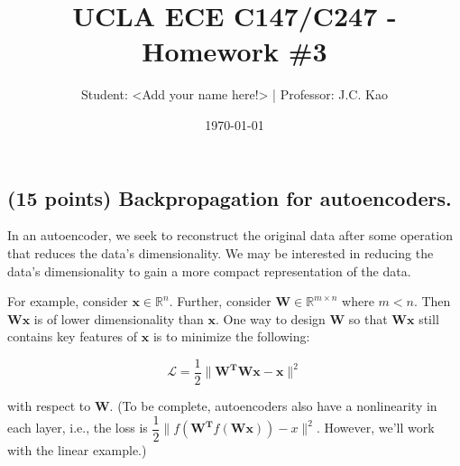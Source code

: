 \documentclass{article}
\title{UCLA ECE C147/C247 - Homework \#3}
\author{Student: <Add your name here!> | Professor: J.C. Kao} %
\date{\today}
\begin{document}
\maketitle

\subsection*{(15 points) Backpropagation for autoencoders. \newline}

In an autoencoder, we seek to reconstruct the original data after some operation that reduces the data’s dimensionality. We may be interested in reducing the data’s dimensionality to gain a more compact representation of the data.

For example, consider $\mathbf{x} \in \mathbb{R}^n$. Further, consider $\mathbf{W} \in \mathbb{R}^{m \times n}$ where $m < n$. Then $\mathbf{Wx}$ is of lower dimensionality than $\mathbf{x}$. One way to design $\mathbf{W}$ so that $\mathbf{Wx}$ still contains key features of $\mathbf{x}$ is to minimize the following:

$$\mathcal{L} = \dfrac{1}{2} \|\mathbf{W^TWx} - \mathbf{x}\|^2$$

with respect to $\mathbf{W}$. (To be complete, autoencoders also have a nonlinearity in each layer, i.e., the loss is $ \dfrac{1}{2} \|f(\mathbf{W^T}f(\mathbf{Wx})) - x\|^2$. However, we’ll work with the linear example.) \newline
\end{document}
